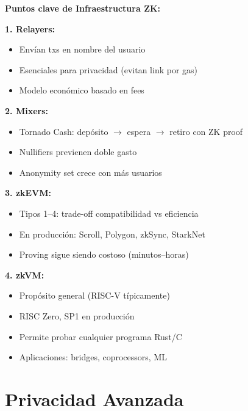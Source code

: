 \documentclass[11pt,a4paper,twoside]{book}
\begin{document}
\begin{keyidea}
\textbf{Puntos clave de Infraestructura ZK:}

\textbf{1. Relayers:}
\begin{itemize}
    \item Env\'ian txs en nombre del usuario
    \item Esenciales para privacidad (evitan link por gas)
    \item Modelo econ\'omico basado en fees
\end{itemize}

\textbf{2. Mixers:}
\begin{itemize}
    \item Tornado Cash: dep\'osito $\to$ espera $\to$ retiro con ZK proof
    \item Nullifiers previenen doble gasto
    \item Anonymity set crece con m\'as usuarios
\end{itemize}

\textbf{3. zkEVM:}
\begin{itemize}
    \item Tipos 1--4: trade-off compatibilidad vs eficiencia
    \item En producci\'on: Scroll, Polygon, zkSync, StarkNet
    \item Proving sigue siendo costoso (minutos--horas)
\end{itemize}

\textbf{4. zkVM:}
\begin{itemize}
    \item Prop\'osito general (RISC-V t\'ipicamente)
    \item RISC Zero, SP1 en producci\'on
    \item Permite probar cualquier programa Rust/C
    \item Aplicaciones: bridges, coprocessors, ML
\end{itemize}
\end{keyidea}


\chapter{Privacidad Avanzada}
\label{ch:privacidad-avanzada}
\end{document}
